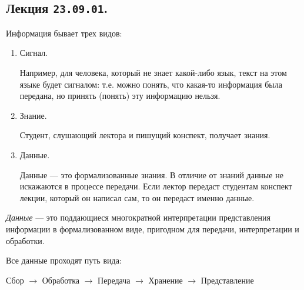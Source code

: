 \subsection{%
  Лекция \texttt{23.09.01}.%
}

Информация бывает трех видов:
\begin{enumerate}
\item
  Сигнал.

  Например, для человека, который не знает какой-либо язык, текст на этом языке
  будет сигналом: т.е. можно понять, что какая-то информация была передана, но
  принять (понять) эту информацию нельзя.

\item
  Знание.

  Студент, слушающий лектора и пишущий конспект, получает знания.

\item
  Данные.

  Данные --- это формализованные знания. В отличие от знаний данные не искажаются в
  процессе передачи. Если лектор передаст студентам конспект лекции, который он
  написал сам, то он передаст именно данные.
\end{enumerate}

\begin{definition}
  \textit{Данные} --- это поддающиеся многократной интерпретации представления информации
  в формализованном виде, пригодном для передачи, интерпретации и обработки.
\end{definition}

Все данные проходят путь вида:
\begin{center}
  Сбор \(\to\)
  Обработка \(\to\)
  Передача \(\to\)
  Хранение \(\to\)
  Представление
\end{center}
